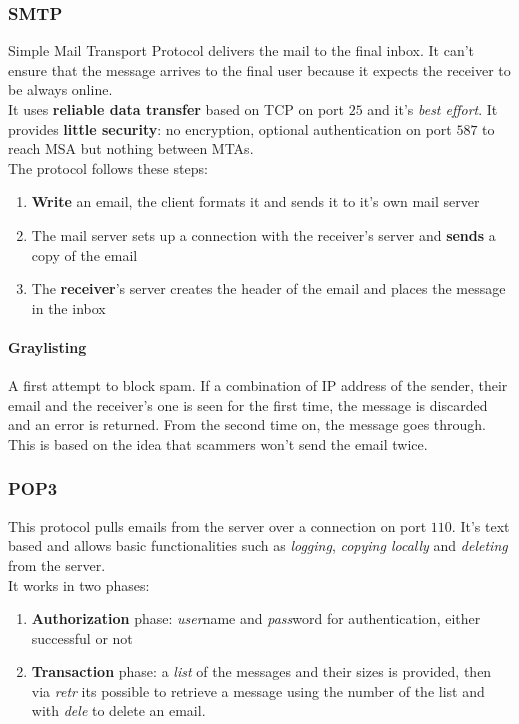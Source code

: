 \subsubsection{SMTP}
Simple Mail Transport Protocol delivers the mail to the final inbox. It can't ensure that the message arrives to the final user because it expects the receiver to be always online.\\
It uses \textbf{reliable data transfer} based on TCP on port $25$ and it's \textit{best effort}. It provides \textbf{little security}: no encryption, optional authentication on port $587$ to reach MSA but nothing between MTAs.\\
The protocol follows these steps:
\begin{enumerate}
	\item \textbf{Write} an email, the client formats it and sends it to it's own mail server
	\item The mail server sets up a connection with the receiver's server and \textbf{sends} a copy of the email
	\item The \textbf{receiver}'s server creates the header of the email and places the message in the inbox
\end{enumerate}

\paragraph{Graylisting} A first attempt to block spam. If a combination of IP address of the sender, their email and the receiver's one is seen for the first time, the message is discarded and an error is returned. From the second time on, the message goes through. This is based on the idea that scammers won't send the email twice.

\subsubsection{POP3}
This protocol pulls emails from the server over a connection on port $110$. It's text based and allows basic functionalities such as \textit{logging}, \textit{copying locally} and \textit{deleting} from the server.\\
It works in two phases:
\begin{enumerate}
	\item \textbf{Authorization} phase: \textit{user}name and \textit{pass}word for authentication, either successful or not
	\item \textbf{Transaction} phase: a \textit{list} of the messages and their sizes is provided, then via \textit{retr} its possible to retrieve a message using the number of the list and with \textit{dele} to delete an email.
\end{enumerate}

